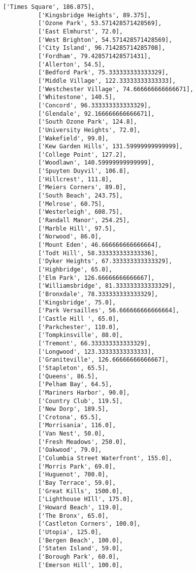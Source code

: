 \documentclass[11pt]{article}
\begin{document}
\begin{Verbatim}[commandchars=\\\{\}]
          ['Times Square', 186.875],
          ['Kingsbridge Heights', 89.375],
          ['Ozone Park', 53.571428571428569],
          ['East Elmhurst', 72.0],
          ['West Brighton', 54.571428571428569],
          ['City Island', 96.714285714285708],
          ['Fordham', 79.428571428571431],
          ['Allerton', 54.5],
          ['Bedford Park', 75.333333333333329],
          ['Middle Village', 122.33333333333333],
          ['Westchester Village', 74.666666666666671],
          ['Whitestone', 140.5],
          ['Concord', 96.333333333333329],
          ['Glendale', 92.166666666666671],
          ['South Ozone Park', 124.8],
          ['University Heights', 72.0],
          ['Wakefield', 99.0],
          ['Kew Garden Hills', 131.59999999999999],
          ['College Point', 127.2],
          ['Woodlawn', 140.59999999999999],
          ['Spuyten Duyvil', 106.8],
          ['Hillcrest', 111.8],
          ['Meiers Corners', 89.0],
          ['South Beach', 243.75],
          ['Melrose', 60.75],
          ['Westerleigh', 608.75],
          ['Randall Manor', 254.25],
          ['Marble Hill', 97.5],
          ['Norwood', 86.0],
          ['Mount Eden', 46.666666666666664],
          ['Todt Hill', 58.333333333333336],
          ['Dyker Heights', 67.333333333333329],
          ['Highbridge', 65.0],
          ['Elm Park', 126.66666666666667],
          ['Williamsbridge', 81.333333333333329],
          ['Bronxdale', 78.333333333333329],
          ['Kingsbridge', 75.0],
          ['Park Versailles', 56.666666666666664],
          ['Castle Hill ', 65.0],
          ['Parkchester', 110.0],
          ['Tompkinsville', 88.0],
          ['Tremont', 66.333333333333329],
          ['Longwood', 123.33333333333333],
          ['Graniteville', 126.66666666666667],
          ['Stapleton', 65.5],
          ['Queens', 86.5],
          ['Pelham Bay', 64.5],
          ['Mariners Harbor', 90.0],
          ['Country Club', 119.5],
          ['New Dorp', 189.5],
          ['Crotona', 65.5],
          ['Morrisania', 116.0],
          ['Van Nest', 50.0],
          ['Fresh Meadows', 250.0],
          ['Oakwood', 79.0],
          ['Columbia Street Waterfront', 155.0],
          ['Morris Park', 69.0],
          ['Huguenot', 700.0],
          ['Bay Terrace', 59.0],
          ['Great Kills', 1500.0],
          ['Lighthouse HIll', 175.0],
          ['Howard Beach', 119.0],
          ['The Bronx', 65.0],
          ['Castleton Corners', 100.0],
          ['Utopia', 125.0],
          ['Bergen Beach', 100.0],
          ['Staten Island', 59.0],
          ['Borough Park', 60.0],
          ['Emerson Hill', 100.0],

\end{Verbatim}
\end{document}
